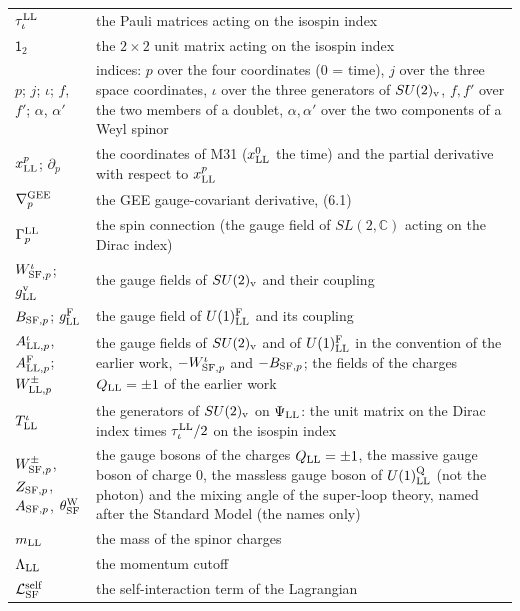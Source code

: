 \documentclass[
  10pt,
]{article}
\begin{document}
\begin{longtable}[]{@{}
  >{\raggedright\arraybackslash}p{}
  >{\raggedright\arraybackslash}p{}@{}}
\(\tau^{\rm LL}_\iota\) & the Pauli matrices acting on the isospin
index \\
\(\mathsf 1_2\) & the \(2\times2\) unit matrix acting on the isospin
index \\
\(p\); \(j\); \(\iota\); \(f\), \(f'\); \(\alpha\), \(\alpha'\) &
indices: \(p\) over the four coordinates (0 = time), \(j\) over the
three space coordinates, \(\iota\) over the three generators of
\(SU(2)_{\rm v}\), \(f,f'\) over the two members of a doublet,
\(\alpha,\alpha'\) over the two components of a Weyl spinor \\
\(x^p_{\rm LL}\); \(\partial_p\) & the coordinates of M31
(\(x^0_{\rm LL}\) the time) and the partial derivative with respect to
\(x^p_{\rm LL}\) \\
\(\nabla^{\rm GEE}_p\) & the GEE gauge-covariant derivative, (6.1) \\
\(\Gamma^{\rm LL}_p\) & the spin connection (the gauge field of
\(SL(2,\mathbb C)\) acting on the Dirac index) \\
\(W^\iota_{{\rm SF},p}\); \(g^{\rm v}_{\rm LL}\) & the gauge fields of
\(SU(2)_{\rm v}\) and their coupling \\
\(B_{{\rm SF},p}\); \(g^{\rm F}_{\rm LL}\) & the gauge field of
\(U(1)^{\rm F}_{\rm LL}\) and its coupling \\
\(A^\iota_{{\rm LL},p}\), \(A^{\rm F}_{{\rm LL},p}\);
\(W^\pm_{{\rm LL},p}\) & the gauge fields of \(SU(2)_{\rm v}\) and of
\(U(1)^{\rm F}_{\rm LL}\) in the convention of the earlier work,
\(-W^\iota_{{\rm SF},p}\) and \(-B_{{\rm SF},p}\); the fields of the
charges \(Q_{\rm LL}=\pm1\) of the earlier work \\
\(T^\iota_{\rm LL}\) & the generators of \(SU(2)_{\rm v}\) on
\(\Psi_{\rm LL}\): the unit matrix on the Dirac index times
\(\tau^{\rm LL}_\iota/2\) on the isospin index \\
\(W^\pm_{{\rm SF},p}\), \(Z_{{\rm SF},p}\), \(A_{{\rm SF},p}\),
\(\theta^{\rm W}_{\rm SF}\) & the gauge bosons of the charges
\(Q_{\rm LL}=\pm1\), the massive gauge boson of charge 0, the massless
gauge boson of \(U(1)^{\rm Q}_{\rm LL}\) (not the photon) and the mixing
angle of the super-loop theory, named after the Standard Model (the
names only) \\
\(m_{\rm LL}\) & the mass of the spinor charges \\
\(\Lambda_{\rm LL}\) & the momentum cutoff \\
\(\mathcal L^{\rm self}_{\rm SF}\) & the self-interaction term of the
Lagrangian \\

\end{longtable}
\end{document}
